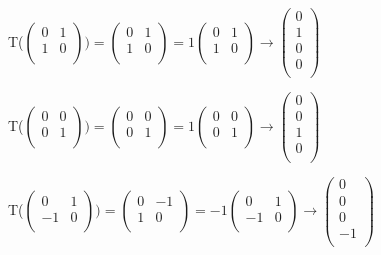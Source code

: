 \documentclass[12pt]{article}
\begin{document}
\begin{enumerate}
    T($\begin{pmatrix}
        0 & 1 \\
        1 & 0\\
    \end{pmatrix}) = \begin{pmatrix}
        0 & 1 \\
        1 & 0\\
    \end{pmatrix} = 1\begin{pmatrix}
        0 & 1 \\
        1 & 0\\
    \end{pmatrix} \rightarrow \begin{pmatrix}
        0 \\
        1\\
        0\\
        0\\
    \end{pmatrix}$

    T($\begin{pmatrix}
        0 & 0 \\
        0 & 1\\
    \end{pmatrix}) = \begin{pmatrix}
        0 & 0 \\
        0 & 1\\
    \end{pmatrix} = 1\begin{pmatrix}
        0 & 0 \\
        0 & 1\\
    \end{pmatrix} \rightarrow \begin{pmatrix}
        0 \\
        0\\
        1\\
        0\\
    \end{pmatrix}$

    T($\begin{pmatrix}
        0 & 1 \\
        -1 & 0\\
    \end{pmatrix}) = \begin{pmatrix}
        0 & -1 \\
        1 & 0\\
    \end{pmatrix} = -1\begin{pmatrix}
        0 & 1 \\
        -1 & 0\\
    \end{pmatrix} \rightarrow \begin{pmatrix}
        0 \\
        0\\
        0\\
        -1\\
    \end{pmatrix}$


\end{enumerate}
\end{document}
